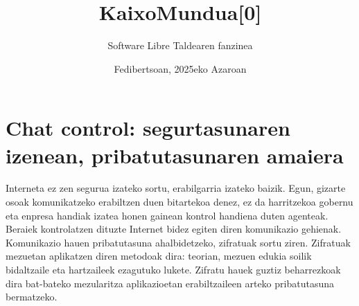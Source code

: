 \documentclass[]{report}
\title{KaixoMundua[0]}
\author{Software Libre Taldearen fanzinea}
\date{Fedibertsoan, 2025eko Azaroan}
\begin{document}


\selectfont

\selectfont
\renewcommand{\rmdefault}{lmtt}


\section*{Chat control: segurtasunaren izenean, pribatutasunaren amaiera}











Interneta ez zen segurua izateko sortu, erabilgarria izateko baizik. Egun, gizarte osoak komunikatzeko erabiltzen duen bitartekoa denez, ez da harritzekoa gobernu eta enpresa handiak izatea honen gainean kontrol handiena duten agenteak. Beraiek kontrolatzen dituzte Internet bidez egiten diren komunikazio gehienak. \\

Komunikazio hauen pribatutasuna ahalbidetzeko, zifratuak sortu ziren. Zifratuak mezuetan aplikatzen diren metodoak dira: teorian, mezuen edukia soilik bidaltzaile eta hartzaileek ezagutuko lukete. Zifratu hauek guztiz beharrezkoak dira bat-bateko mezularitza aplikazioetan erabiltzaileen arteko pribatutasuna bermatzeko. \\
\end{document}

